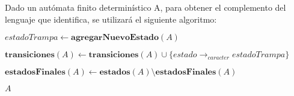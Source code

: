 Dado un autómata finito determinístico A, para obtener el complemento del lenguaje que identifica, se utilizará el siguiente algoritmo:

\begin{algorithm}
\begin{algorithmic}[1]
    \State $estadoTrampa \gets \textbf{agregarNuevoEstado}(A)$




          \State $\textbf{transiciones}(A) \gets \textbf{transiciones}(A) \cup \{estado \rightarrow_{caracter} estadoTrampa\}$
        \EndIf
      \EndFor
    \EndFor

    \State $\textbf{estadosFinales}(A) \gets \textbf{estados}(A) \setminus \textbf{estadosFinales}(A)$

    \State \Return $A$
  \EndFunction
\end{algorithmic}
\end{algorithm}
